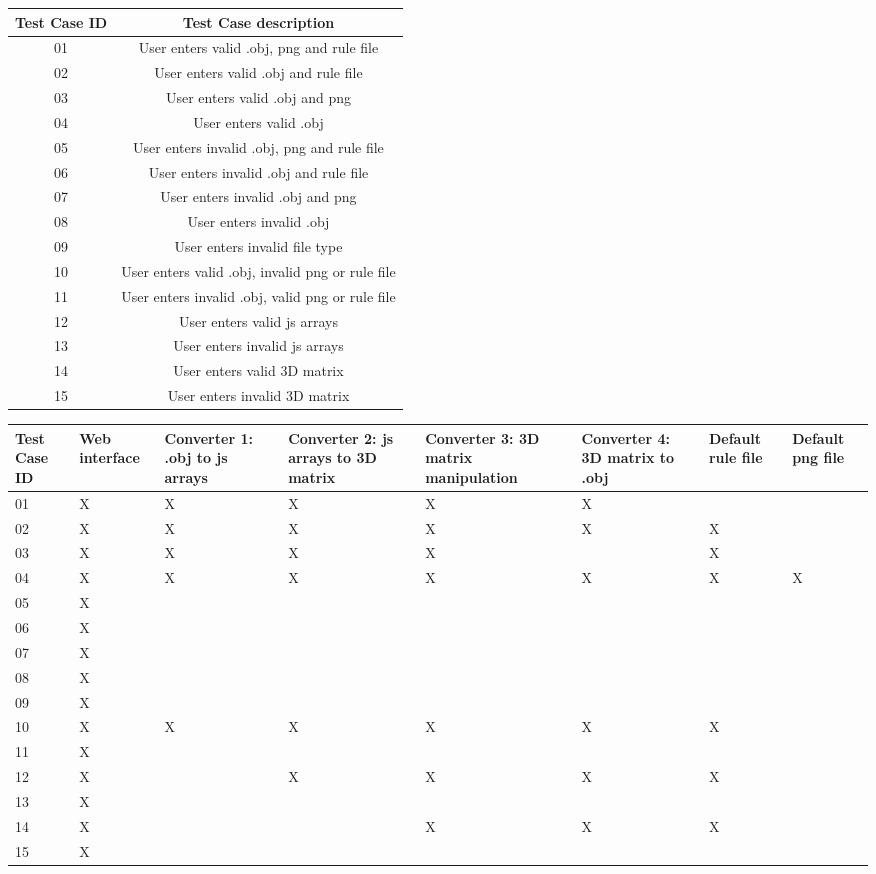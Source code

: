 \documentclass[english]{article}
\begin{document}
	\begin{tabular}{||c | c||} 
		\hline
		Test Case ID & Test Case description \\ [0.5ex] 
		\hline\hline
		01 & User enters valid .obj, png and rule file \\ 
		\hline
		02 & User enters valid .obj and rule file \\
		\hline
		03 & User enters valid .obj and png \\
		\hline
		04 & User enters valid .obj \\
		\hline
		05 & User enters invalid .obj, png and rule file \\
		\hline
		06 & User enters invalid .obj and rule file \\
		\hline
		07 & User enters invalid .obj and png \\
		\hline
		08 & User enters invalid .obj \\
		\hline
		09 & User enters invalid file type \\
		\hline
		10 & User enters valid .obj, invalid png or rule file \\
		\hline
		11 & User enters invalid .obj, valid png or rule file \\
		\hline
		12 & User enters valid js arrays \\
		\hline
		13 & User enters invalid js arrays \\
		\hline
		14 & User enters valid 3D matrix \\
		\hline
		15 & User enters invalid 3D matrix \\
		\hline
	\end{tabular}

	\begin{tabular}{|| m{1.5cm} |m{1.5cm} | m{1.5cm} | m{1.5cm} | m{1.5cm} | m{1.5cm} | m{1.5cm} | m{1.5cm}||} 
		\hline
		Test Case ID & Web interface & Converter 1: .obj to js arrays & Converter 2: js arrays to 3D matrix & Converter 3: 3D matrix manipulation & Converter 4: 3D matrix to .obj & Default rule file & Default png file \\ [0.5ex] 
		\hline\hline
		01 & X & X & X & X & X &  &  \\ 
		\hline
		02 & X & X & X & X & X & X &  \\
		\hline
		03 & X & X & X & X &  & X \\
		\hline
		04 & X & X & X & X & X & X & X \\
		\hline
		05 & X &  &  &  &  &  &  \\
		\hline
		06 & X &  &  &  &  &  \\
		\hline
		07 & X &  &  &  &  &  \\
		\hline
		08 & X &  &  &  &  &  \\
		\hline
		09 & X &  &  &  &  &  \\
		\hline
		10 & X & X & X & X & X & X \\
		\hline
		11 & X &  &  &  &  &  \\
		\hline
		12 & X &  & X & X & X & X \\
		\hline
		13 & X &  &  &  &  &  \\
		\hline
		14 & X &  &  & X & X & X \\
		\hline
		15 & X &  &  &  &  &  \\
		\hline
	\end{tabular}
\end{document}
